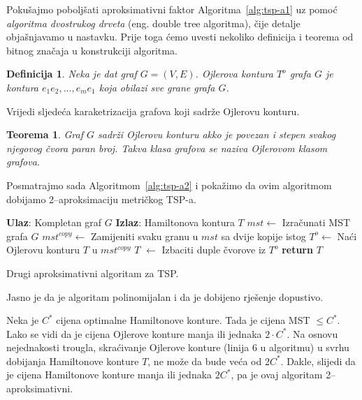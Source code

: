 \documentclass[b5paper, utf8, 11pt, colorlinks]{book}
\newtheorem{definition}{Definicija}[chapter]
\newtheorem{thm}{Teorema}[chapter]
\theoremstyle{definition}
\begin{document}
 \noindent Pokušajmo poboljšati aproksimativni faktor Algoritma~\ref{alg:tsp-a1} uz pomoć \emph{algoritma dvostrukog drveta} (eng. double tree algoritma), čije detalje objašnjavamo u nastavku. Prije toga ćemo uvesti nekoliko definicija i teorema od bitnog značaja u konstrukciji algoritma. 
 \begin{definition}
 	  Neka je dat graf $G=(V,E)$. Ojlerova kontura $T^o$ grafa $G$ je kontura $e_1e_2,...,e_me_1$ koja obilazi sve grane grafa $G$. 
 \end{definition}
Vrijedi sljedeća karaketrizacija grafova koji sadrže Ojlerovu konturu. 
\begin{thm}
	 Graf $G$ sadrži Ojlerovu konturu akko je povezan i stepen svakog njegovog čvora paran broj. Takva klasa grafova se naziva Ojlerovom klasom grafova.
\end{thm}
Posmatrajmo sada  Algoritmom~\ref{alg:tsp-a2} i pokažimo da ovim algoritmom  dobijamo 2--aproksimaciju metričkog TSP-a.
\begin{algorithm}[H] 
	\begin{algorithmic}[1]
		\STATE \textbf{Ulaz}: Kompletan graf $G$
		\STATE \textbf{Izlaz}: Hamiltonova kontura $T$   
		\STATE $mst \gets$  Izračunati MST grafa $G$
		\STATE $mst^{copy} \gets$ Zamijeniti svaku granu u $mst$ sa dvije kopije istog
		\STATE $T^o \gets$ Naći Ojlerovu konturu $T$ u $mst^{copy}$
		\STATE   $T$ $\gets$ Izbaciti duple čvorove iz $T^o$   
		\STATE \textbf{return} $T$ 
	\end{algorithmic}
   	\caption{Drugi aproksimativni algoritam za TSP.}
   	\label{alg:tsp-a2}
\end{algorithm}
   Jasno je da je algoritam polinomijalan i da je dobijeno rješenje dopustivo. 
   
  Neka je $C^*$ cijena optimalne Hamiltonove konture. Tada je cijena MST $\leq C^*$. 
  Lako se vidi da je cijena Ojlerove konture  manja ili jednaka $ 2 \cdot C^*$. Na osnovu nejednakosti trougla, skraćivanje Ojlerove konture (linija 6 u algoritmu) u svrhu dobijanja Hamiltonove konture $T$, ne može da bude veća od 2$C^*$. Dakle, slijedi da je cijena Hamiltonove konture manja ili jednaka $2 C^*$, pa je ovaj algoritam 2--aproksimativni.
  
\end{document}
